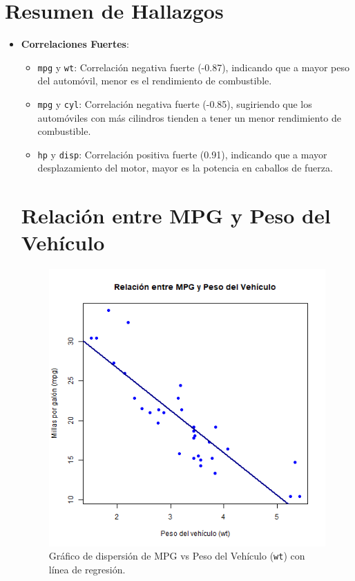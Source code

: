 \documentclass{article}
\begin{document}
\section{Resumen de Hallazgos}
\begin{itemize}
    \item \textbf{Correlaciones Fuertes}:
    \begin{itemize}
        \item \texttt{mpg} y \texttt{wt}: Correlación negativa fuerte (-0.87), indicando que a mayor peso del automóvil, menor es el rendimiento de combustible.
        \item \texttt{mpg} y \texttt{cyl}: Correlación negativa fuerte (-0.85), sugiriendo que los automóviles con más cilindros tienden a tener un menor rendimiento de combustible.
        \item \texttt{hp} y \texttt{disp}: Correlación positiva fuerte (0.91), indicando que a mayor desplazamiento del motor, mayor es la potencia en caballos de fuerza.
    \end{itemize}
    
    \section*{Relación entre MPG y Peso del Vehículo}
\begin{figure}[H]
    \centering
    \includegraphics[width=\textwidth]{mpg_vs_wt.png}
    \caption{Gráfico de dispersión de MPG vs Peso del Vehículo (\texttt{wt}) con línea de regresión.}
    \label{fig:mpg_vs_wt}
\end{figure}


\end{itemize}
\end{document}
